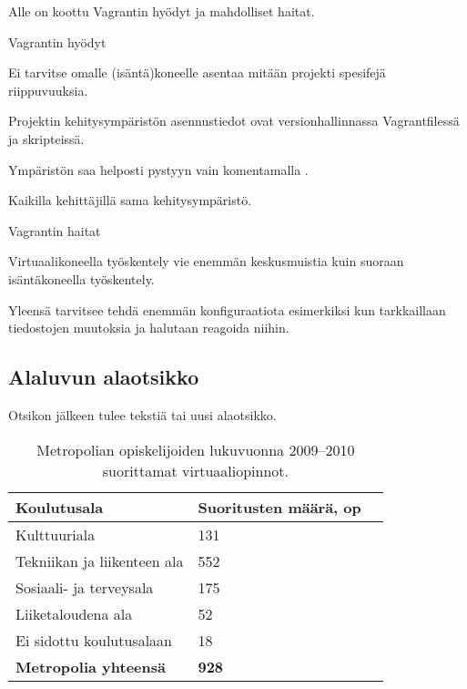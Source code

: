 Alle on koottu Vagrantin hyödyt ja mahdolliset haitat.

Vagrantin hyödyt
\begin{bullet-list}
  \item Ei tarvitse omalle (isäntä)koneelle asentaa mitään projekti spesifejä riippuvuuksia.
  \item Projektin kehitysympäristön asennustiedot ovat versionhallinnassa Vagrantfilessä ja skripteissä.
  \item Ympäristön saa helposti pystyyn vain komentamalla .
  \item Kaikilla kehittäjillä sama kehitysympäristö.
\end{bullet-list}

Vagrantin haitat
\begin{bullet-list}
  \item Virtuaalikoneella työskentely vie enemmän keskusmuistia kuin suoraan isäntäkoneella työskentely.
  \item Yleensä tarvitsee tehdä enemmän konfiguraatiota esimerkiksi kun tarkkaillaan tiedostojen muutoksia ja halutaan reagoida niihin.
\end{bullet-list}

\subsection{Alaluvun alaotsikko}

Otsikon jälkeen tulee tekstiä tai uusi alaotsikko.

\begin{table}[h]
  \caption{Metropolian opiskelijoiden lukuvuonna 2009–2010 suorittamat virtuaaliopinnot.}
  \begin{tabular}{| l | l | l |}
  \hline
  \bfseries Koulutusala & \bfseries Suoritusten määrä, op \\
  \hline
  Kulttuuriala & 131 \\
  \hline
  Tekniikan ja liikenteen ala & 552 \\
  \hline
  Sosiaali- ja terveysala & 175 \\
  \hline
  Liiketaloudena ala & 52 \\
  \hline
  Ei sidottu koulutusalaan & 18 \\
  \hline
  \bfseries Metropolia yhteensä & \bfseries 928 \\
  \hline
  \end{tabular}
  \label{tab:virtual studies}
\end{table}


